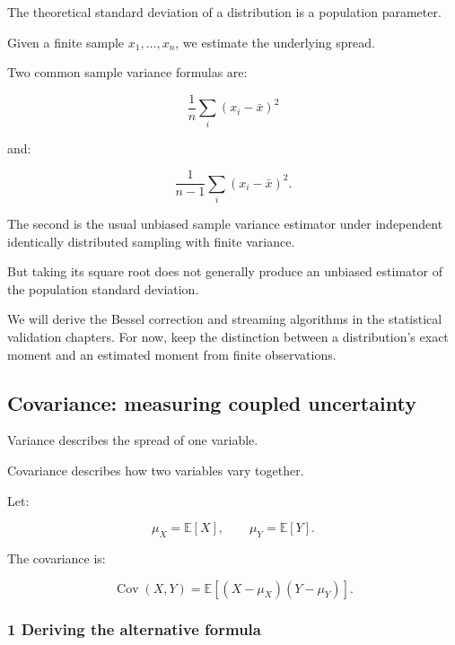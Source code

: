 \hypertarget{02-foundations-ii-ch023-population-versus-sample-standard-deviation}{}

The theoretical standard deviation of a distribution is a population parameter.

Given a finite sample \(x_1,\ldots,x_n\), we estimate the underlying spread.

Two common sample variance formulas are:

\[
 \frac1n\sum_i(x_i-\bar x)^2
\]

and:

\[
 \frac1{n-1}\sum_i(x_i-\bar x)^2.
\]

The second is the usual unbiased sample variance estimator under independent identically distributed sampling with finite variance.

But taking its square root does not generally produce an unbiased estimator of the population standard deviation.

We will derive the Bessel correction and streaming algorithms in the statistical validation chapters. For now, keep the distinction between a distribution's exact moment and an estimated moment from finite observations.

\subsection{Covariance: measuring coupled uncertainty}\label{02-foundations-ii-ch023-covariance-measuring-coupled-uncertainty}

\hypertarget{02-foundations-ii-ch023-covariance-measuring-coupled-uncertainty}{}

Variance describes the spread of one variable.

Covariance describes how two variables vary together.

Let:

\[
 \mu_X=\mathbb E[X], \qquad \mu_Y=\mathbb E[Y].
\]

The covariance is:

\[
 \boxed{ \operatorname{Cov}(X,Y)= \mathbb E[(X-\mu_X)(Y-\mu_Y)] }.
\]

\subsubsection{1 Deriving the alternative formula}\label{02-foundations-ii-ch023-deriving-the-alternative-formula}

\hypertarget{02-foundations-ii-ch023-deriving-the-alternative-formula}{}

